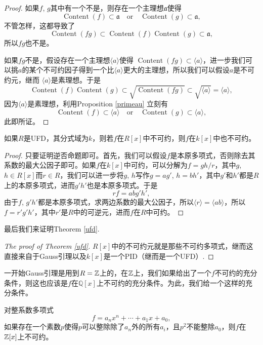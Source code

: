 \begin{proof}
	如果$f$, $g$其中有一个不是，则存在一个主理想$\mathfrak a$使得
	\[
		\operatorname{Content}(f)\subset \mathfrak a\quad \text{or}\quad \operatorname{Content}(g)\subset \mathfrak a,
	\]
	不管怎样，这都导致了
	\[
		\operatorname{Content}(fg)\subset \operatorname{Content}(f)\operatorname{Content}(g)\subset \mathfrak a,
	\]
	所以$fg$也不是。

	如果$fg$不是，假设存在一个主理想$\langle a\rangle$使得
	$
		\operatorname{Content}(fg)\subset \langle a\rangle
	$，进一步我们可以挑$a$的某个不可约因子得到一个比$\langle a\rangle$更大的主理想，所以我们可以假设$a$是不可约元，继而
	$\langle a\rangle$是素理想。于是
	\[
		\operatorname{Content}(f)\operatorname{Content}(g)\subset \sqrt{\operatorname{Content}(fg)}\subset \sqrt{\langle a\rangle}=\langle a\rangle,
	\]
	因为$\langle a\rangle$是素理想，利用Proposition \ref{primeau} 立刻有
	\[
	\operatorname{Content}(f)\subset \langle a\rangle\quad \text{or}\quad \operatorname{Content}(g)\subset \langle a\rangle,
	\]
	此即所证。
\end{proof}

\begin{lem}[Gauss引理]
	如果$R$是UFD，其分式域为$k$，则若$f$在$R[x]$中不可约，则$f$在$k[x]$中也不可约。
\end{lem}

\begin{proof}
	只要证明逆否命题即可。首先，我们可以假设$f$是本原多项式，否则除去其系数的最大公因子即可。如果$f$在$k[x]$中可约，可以分解为$f=gh/r$，其中$g$, $h\in R[x]$而$r\in R$，我们可以进一步将$g$, $h$写作$g=ag'$, $h=bh'$，其中$g'$和$h'$都是$R$上的本原多项式，进而$g'h'$也是本原多项式。于是
	\[
		rf=abg'h',
	\]
	由于$f$, $g'h'$都是本原多项式，求两边系数的最大公因子，所以$\langle r\rangle =\langle ab\rangle$，所以$f=r'g'h'$，其中$r'$是$R$中的可逆元，进而$f$在$R$中可约。
\end{proof}

最后我们来证明Theorem \ref{ufd}.
\begin{proof}[The proof of Theorem \ref{ufd}]
	$R[x]$中的不可约元就是那些不可约多项式，继而这直接来自于Gauss引理以及$k[x]$是一个PID（继而是一个UFD）.
\end{proof}

一开始Gauss引理是用到$R=\mathbb{Z}$上的，在$\mathbb{Z}$上，我们如果给出了一个$f$不可约的充分条件，则这也应该是$f$在$\mathbb{Q}[x]$上不可约的充分条件。为此，我们给一个这样的充分条件。

\begin{pro}[Eisenstein判别法]
	对整系数多项式
	\[
		f=a_nx^n+\cdots+a_1x+a_0,
	\]
	如果存在一个素数$p$使得$p$可以整除除了$a_n$外的所有$a_i$，且$p^2$不能整除$a_0$，则$f$在$\mathbb{Z}[x]$上不可约。
\end{pro}

